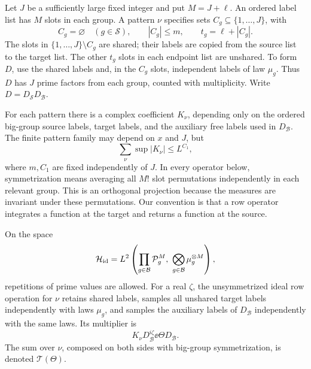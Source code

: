 Let $J$ be a sufficiently large fixed integer and put $M=J+\ell$.
An ordered label list has $M$ slots in each group.  A pattern $\nu$
specifies sets $C_g\subseteq\{1,\ldots,J\}$, with
\[
 C_g=\varnothing\quad(g\in\mathcal S),\qquad |C_g|\le m,
 \qquad t_g=\ell+|C_g|.
\]
The slots in $\{1,\ldots,J\}\setminus C_g$ are shared; their labels
are copied from the source list to the target list.  The other $t_g$
slots in each endpoint list are unshared.  To form $D$, use the shared labels
and, in the $C_g$ slots, independent labels of law $\mu_g$.  Thus
$D$ has $J$ prime factors from each group, counted with multiplicity.
Write $D=D_{\mathcal S}D_{\mathcal B}$.

For each pattern there is a complex coefficient $K_\nu$, depending
only on the ordered big-group source labels, target labels, and the
auxiliary free labels used in $D_{\mathcal B}$.  The finite pattern
family may depend on $x$ and $J$, but
\begin{equation}\label{eq:pattern-mass}
 \sum_\nu\sup|K_\nu|\le L^{C_1},
\end{equation}
where $m,C_1$ are fixed independently of $J$.  In every operator
below, symmetrization means averaging all $M!$ slot permutations
independently in each relevant group.  This is an orthogonal
projection because the measures are invariant under these permutations.
Our convention is that a row operator integrates a function at the
target and returns a function at the source.

\begin{definition}\label{def:ideal-operator}
On the space
\[
 \mathcal H_{\rm id}
 =L^2\left(\prod_{g\in\mathcal B}\mathcal P_g^M,
               \ \bigotimes_{g\in\mathcal B}\mu_g^{\otimes M}\right),
\]
repetitions of prime values are allowed.  For a real $\zeta$, the
unsymmetrized ideal row operation for $\nu$ retains shared labels,
samples all unshared target labels independently with laws $\mu_g$,
and samples the auxiliary labels of $D_{\mathcal B}$ independently
with the same laws.  Its multiplier is
\[
 K_\nu D_{\mathcal B}^{i\zeta}\ee{\Theta D_{\mathcal B}}.
\]
The sum over $\nu$, composed on both sides with big-group
symmetrization, is denoted $\mathcal T(\Theta)$.
\end{definition}

